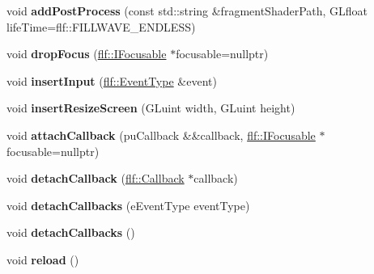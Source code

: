 \begin{DoxyCompactItemize}
\item 
void {\bfseries add\+Post\+Process} (const std\+::string \&fragment\+Shader\+Path, G\+Lfloat life\+Time=flf\+::\+F\+I\+L\+L\+W\+A\+V\+E\+\_\+\+E\+N\+D\+L\+E\+SS)\hypertarget{classflw_1_1Engine_aa8b374f4d6ab820ed055cde1e25bba5f}{}\label{classflw_1_1Engine_aa8b374f4d6ab820ed055cde1e25bba5f}

\item 
void {\bfseries drop\+Focus} (\hyperlink{classflw_1_1flf_1_1IFocusable}{flf\+::\+I\+Focusable} $\ast$focusable=nullptr)\hypertarget{classflw_1_1Engine_a5d612ba035d704f364ef80e217f4701f}{}\label{classflw_1_1Engine_a5d612ba035d704f364ef80e217f4701f}

\item 
void {\bfseries insert\+Input} (\hyperlink{classflw_1_1flf_1_1EventType}{flf\+::\+Event\+Type} \&event)\hypertarget{classflw_1_1Engine_a9450a7a12a0b0b0c8ced673c54272a78}{}\label{classflw_1_1Engine_a9450a7a12a0b0b0c8ced673c54272a78}

\item 
void {\bfseries insert\+Resize\+Screen} (G\+Luint width, G\+Luint height)\hypertarget{classflw_1_1Engine_a5c99dffdf37876df266a28ab3aa59b3b}{}\label{classflw_1_1Engine_a5c99dffdf37876df266a28ab3aa59b3b}

\item 
void {\bfseries attach\+Callback} (pu\+Callback \&\&callback, \hyperlink{classflw_1_1flf_1_1IFocusable}{flf\+::\+I\+Focusable} $\ast$focusable=nullptr)\hypertarget{classflw_1_1Engine_aa879716d8ee4c96122449a01696ca7c4}{}\label{classflw_1_1Engine_aa879716d8ee4c96122449a01696ca7c4}

\item 
void {\bfseries detach\+Callback} (\hyperlink{classflw_1_1flf_1_1Callback}{flf\+::\+Callback} $\ast$callback)\hypertarget{classflw_1_1Engine_ae4f759973523b435f2d8cd9aa95ecbff}{}\label{classflw_1_1Engine_ae4f759973523b435f2d8cd9aa95ecbff}

\item 
void {\bfseries detach\+Callbacks} (e\+Event\+Type event\+Type)\hypertarget{classflw_1_1Engine_a4163beecf0025671be70b19abe70be09}{}\label{classflw_1_1Engine_a4163beecf0025671be70b19abe70be09}

\item 
void {\bfseries detach\+Callbacks} ()\hypertarget{classflw_1_1Engine_aafe6fe8af3b28d7a368a067ff3367405}{}\label{classflw_1_1Engine_aafe6fe8af3b28d7a368a067ff3367405}

\item 
void {\bfseries reload} ()\hypertarget{classflw_1_1Engine_a370ce8e98ce6f22c828a9b089fa149eb}{}\label{classflw_1_1Engine_a370ce8e98ce6f22c828a9b089fa149eb}


\end{DoxyCompactItemize}
